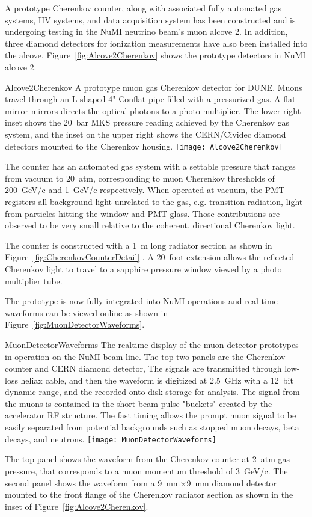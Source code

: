 A prototype Cherenkov counter, along with associated fully automated
gas systems, HV systems, and data acquisition system has been
constructed and is undergoing testing in the NuMI neutrino beam's muon
alcove 2. In addition, three diamond detectors\cite{ref:CERNdiamond}
for ionization measurements have also been installed into the alcove.
Figure~\ref{fig:Alcove2Cherenkov} shows the prototype detectors in
NuMI alcove 2.
\begin{cdrfigure}{Alcove2Cherenkov}
{A prototype muon gas Cherenkov detector for DUNE.  
Muons travel through an L-shaped 4" Conflat pipe filled with a 
pressurized gas. A flat mirror mirrors directs the optical photons 
to a photo multiplier. The lower right inset shows the 20~bar MKS 
pressure reading achieved by the Cherenkov gas system, and the inset 
on the upper right shows the CERN/Cividec diamond detectors mounted to the Cherenkov housing.}
\texttt{[image: Alcove2Cherenkov]}
\end{cdrfigure}

The counter has an automated gas system with a settable pressure that
ranges from vacuum to 20~atm, corresponding to muon Cherenkov
thresholds of 200~GeV/c and 1~GeV/c respectively. When operated at
vacuum, the PMT registers all background light unrelated to the gas,
e.g. transition radiation, light from particles hitting the window and
PMT glass.  Those contributions are observed to be very small relative
to the coherent, directional Cherenkov light.

The counter is constructed with a 1~m long radiator section as shown
in Figure~\ref{fig:CherenkovCounterDetail} . A 20~foot extension
allows the reflected Cherenkov light to travel to a sapphire pressure
window viewed by a photo multiplier tube.

The prototype is now fully integrated into NuMI operations and
real-time waveforms can be viewed online as shown in
Figure~\ref{fig:MuonDetectorWaveforms}. 
\begin{cdrfigure}{MuonDetectorWaveforms}
{The realtime display of the muon detector prototypes in operation 
on the NuMI beam line. The top two panels are the Cherenkov counter 
and CERN diamond detector\cite{ref:CERNdiamond}, The signals are 
transmitted through low-loss heliax cable, and then the waveform 
is digitized at 2.5~GHz with a 12~bit dynamic range, and the 
recorded onto disk storage for analysis. The signal from the 
muons is contained in the short beam pulse "buckets" created 
by the accelerator RF structure. The fast timing allows the 
prompt muon signal to be easily separated from potential backgrounds 
such as stopped muon decays, beta decays, and neutrons.}
\texttt{[image: MuonDetectorWaveforms]}
\end{cdrfigure}
The top panel shows the waveform from the Cherenkov counter at 2~atm
gas pressure, that corresponds to a muon momentum threshold of
3~GeV/c. The second panel shows the waveform from a 9~mm$\times$9~mm
diamond detector mounted to the front flange of the Cherenkov radiator
section as shown in the inset of Figure~\ref{fig:Alcove2Cherenkov}.

